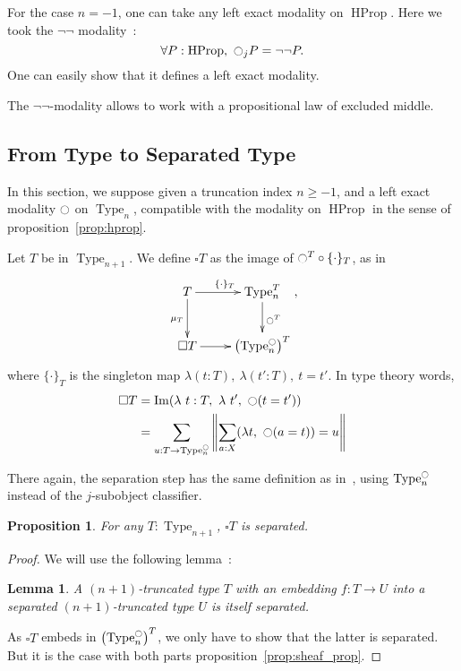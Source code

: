 \documentclass[conference]{IEEEtran}
\newtheorem{prop}[thm]{Proposition}
\newtheorem{lem}[thm]{Lemma}
\DeclareMathOperator{\Type}{Type}
\DeclareMathOperator{\HProp}{HProp}
\DeclareMathOperator{\im}{Im}
\newcommand{\modal}{\ensuremath{\ocircle}}
\begin{document}
For the case $n=-1$, one can take any left exact modality on
$\HProp$. Here we took the $\lnot\lnot$ modality~:
$$\forall P:\HProp,~\modal_j P = \lnot\lnot P.$$
One can easily show that it defines a left exact modality.

The $\lnot\lnot$-modality allows to work with a propositional law of
excluded middle. 

\subsection{From Type to Separated Type}
\label{ssec:from-type-separated}
In this section, we suppose given a truncation index $n\geqslant -1$,
and a left exact modality $\modal$ on $\Type_n$, compatible with the
modality on $\HProp$ in the sense of proposition~\ref{prop:hprop}.

Let $T$ be in $\Type_{n+1}$. We define $\square T$ as the image of
$\modal^T \circ \{\cdot\}_T$, as in
$$\xymatrix{
  T \ar[r]^{\{\cdot\}_T} \ar[d]_{\mu_T} & \Type_n^T \ar[d]^{\modal^T} \\
  \square T \ar[r]& \left( \Type_n^\modal \right)^T
}, $$
where $\{\cdot\}_T$ is the singleton map $\lambda (t:T),~\lambda
(t':T),~t=t'$.
In type theory words, 
\begin{align*}
\square T &= \im (\lambda~t:T,~\lambda~ t',~ \modal (t = t')) \\
          &= \sum_{u:T \to \Type_n^\modal} \left\| \sum_{a:X} 
            (\lambda t,~\modal (a=t)) = u\right\|
\end{align*}

There again, the separation step has the same definition as
in~\cite{maclanemoerdijk}, using $\Type_n^\modal$ instead of the
$j$-subobject classifier.

\begin{prop}
  For any $T:\Type_{n+1}$, $\square T$ is separated.  
\end{prop}

\begin{proof}
We will use the following lemma~:
\begin{lem}
  A $(n+1)$-truncated type $T$ with an embedding $f : T \to U$
  into a separated $(n+1)$-truncated type $U$ is itself separated.
\end{lem}
As $\square T$ embeds in $\left( \Type_n^\modal \right)^T$, we only
have to show that the latter is separated. But it is the case with
both parts proposition~\ref{prop:sheaf_prop}.
\end{proof}
\end{document}
